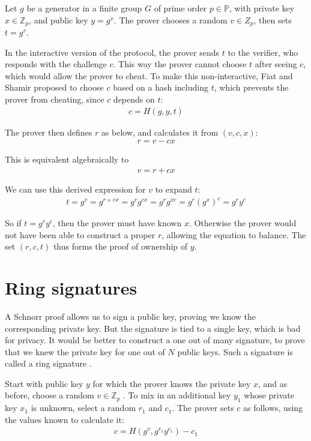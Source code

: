 \documentclass{article}
\begin{document}
Let $g$ be a generator in a finite group $G$ of prime order $p \in \mathbb{P}$, with private key $x \in \mathbb{Z}_p$, and public key $y = g^x$. The prover chooses a random $v \in Z_p$, then sets $t = g^v$.

In the interactive version of the protocol, the prover sends $t$ to the verifier, who responds with the challenge $c$.  This way the prover cannot choose $t$ after seeing $c$, which would allow the prover to cheat.  To make this non-interactive, Fiat and Shamir proposed to choose $c$ based on a hash including $t$, which prevents the prover from cheating, since $c$ depends on $t$:
\begin{align}
  c = H(g,y,t)
\end{align}

The prover then defines $r$ as below, and calculates it from $(v, c, x)$:
\begin{align}
  r = v - cx
\end{align}
 
This is equivalent algebraically to
\begin{align}
  v = r + cx \nonumber
\end{align}

We can use this derived expression for $v$ to expand $t$:
\begin{align}
  t = g^v= g^{r + c x} = g^r g^{cx} = g^r g^{xc} = g^r (g^x)^c = g^r y^c
\end{align}

So if $t = g^r y^c$, then the prover must have known $x$.  Otherwise the prover would not have been able to construct a proper $r$, allowing the equation to balance.  The set $(r,c,t)$ thus forms the proof of ownership of $y$.



\section{Ring signatures}

A Schnorr proof allows us to sign a public key, proving we know the corresponding private key.  But the signature is tied to a single key, which is bad for privacy.  It would be better to construct a one out of many signature, to prove that we knew the private key for one out of $N$ public keys.  Such a signature is called a ring signature \cite{cryptonote}.

Start with public key $y$ for which the prover knows the private key $x$, and as before, choose a random $v \in \mathbb{Z}_p$ . To mix in an additional key $y_1$ whose private key $x_1$ is unknown, select a random $r_1$ and $c_1$.  The prover sets $c$ as follows, using the values known to calculate it:
\begin{align}
  c = H(g^v, g^{r_1} y^{c_1}) - c_1
\end{align}
\end{document}
